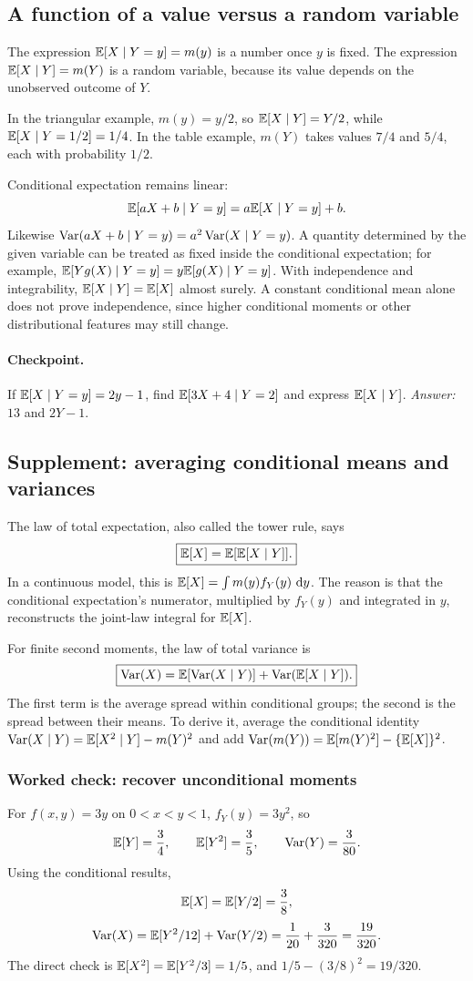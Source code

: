 \subsection{A function of a value versus a random variable}
The expression $\mathbb E[X\mid Y=y]=m(y)$ is a number once $y$ is fixed. The expression $\mathbb E[X\mid Y]=m(Y)$ is a random variable, because its value depends on the unobserved outcome of $Y$.

In the triangular example, $m(y)=y/2$, so $\mathbb E[X\mid Y]=Y/2$, while $\mathbb E[X\mid Y=1/2]=1/4$. In the table example, $m(Y)$ takes values $7/4$ and $5/4$, each with probability $1/2$.

Conditional expectation remains linear:
\[
 \mathbb E[aX+b\mid Y=y]=a\mathbb E[X\mid Y=y]+b.
\]
Likewise $\operatorname{Var}(aX+b\mid Y=y)=a^2\operatorname{Var}(X\mid Y=y)$. A quantity determined by the given variable can be treated as fixed inside the conditional expectation; for example,
$\mathbb E[Yg(X)\mid Y=y]=y\mathbb E[g(X)\mid Y=y]$. With independence and integrability, $\mathbb E[X\mid Y]=\mathbb E[X]$ almost surely. A constant conditional mean alone does not prove independence, since higher conditional moments or other distributional features may still change.

\paragraph{Checkpoint.} If $\mathbb E[X\mid Y=y]=2y-1$, find $\mathbb E[3X+4\mid Y=2]$ and express $\mathbb E[X\mid Y]$. \emph{Answer:} $13$ and $2Y-1$.

\subsection{Supplement: averaging conditional means and variances}
The law of total expectation, also called the tower rule, says
\[
 \boxed{\mathbb E[X]=\mathbb E[\mathbb E[X\mid Y]].}
\]
In a continuous model, this is $\mathbb E[X]=\int m(y)f_Y(y)\,\,\mathrm d y$. The reason is that the conditional expectation's numerator, multiplied by $f_Y(y)$ and integrated in $y$, reconstructs the joint-law integral for $\mathbb E[X]$.

For finite second moments, the law of total variance is
\[
\boxed{\operatorname{Var}(X)=\mathbb E[\operatorname{Var}(X\mid Y)]+\operatorname{Var}(\mathbb E[X\mid Y]).}
\]
The first term is the average spread within conditional groups; the second is the spread between their means. To derive it, average the conditional identity
$\operatorname{Var}(X\mid Y)=\mathbb E[X^2\mid Y]-m(Y)^2$ and add
$\operatorname{Var}(m(Y))=\mathbb E[m(Y)^2]-\{\mathbb E[X]\}^2$.

\subsubsection*{Worked check: recover unconditional moments}
For $f(x,y)=3y$ on $0<x<y<1$, $f_Y(y)=3y^2$, so
\[
 \mathbb E[Y]=\frac34,\qquad\mathbb E[Y^2]=\frac35,\qquad\operatorname{Var}(Y)=\frac3{80}.
\]
Using the conditional results,
\[
 \mathbb E[X]=\mathbb E[Y/2]=\frac38,
\]
\[
 \operatorname{Var}(X)=\mathbb E[Y^2/12]+\operatorname{Var}(Y/2)
 =\frac1{20}+\frac3{320}=\frac{19}{320}.
\]
The direct check is $\mathbb E[X^2]=\mathbb E[Y^2/3]=1/5$, and $1/5-(3/8)^2=19/320$.

